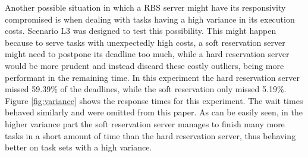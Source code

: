 \documentclass[times, 10pt,twocolumn]{article}
\begin{document}
Another possible situation in which a RBS server might have its
responsivity compromised is when dealing with tasks having a high
variance in its execution costs. Scenario L3 was designed to test this
possibility. This might happen because to serve tasks with
unexpectedly high costs, a soft reservation server might need to
postpone its deadline too much, while a hard reservation server would
be more prudent and instead discard these costly outliers, being more
performant in the remaining time. In this experiment the hard
reservation server missed 59.39\% of the deadlines, while the soft
reservation only missed 5.19\%. Figure \ref{fig:variance} shows the
response times for this experiment. The wait times behaved similarly
and were omitted from this paper. As can be easily seen, in the
higher variance part the soft reservation server manages to finish
many more tasks in a short amount of time than the hard reservation
server, thus behaving better on task sets with a high variance.
\end{document}
